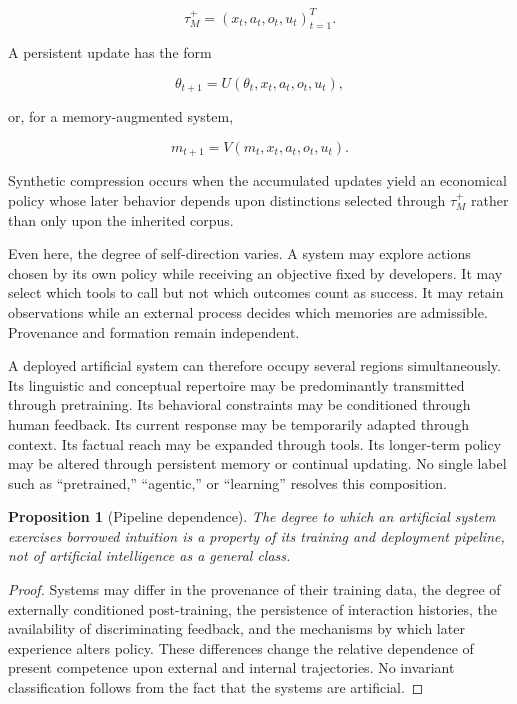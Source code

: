 \documentclass[11pt]{article}
\newtheorem{proposition}{Proposition}[section]
\begin{document}
\[
\tau_M^{+}
=
(x_t,a_t,o_t,u_t)_{t=1}^{T}.
\]

A persistent update has the form

\[
\theta_{t+1}
=
U(\theta_t,x_t,a_t,o_t,u_t),
\]

or, for a memory-augmented system,

\[
m_{t+1}
=
V(m_t,x_t,a_t,o_t,u_t).
\]

Synthetic compression occurs when the accumulated updates yield an economical policy whose later behavior depends upon distinctions selected through $\tau_M^{+}$ rather than only upon the inherited corpus.

Even here, the degree of self-direction varies. A system may explore actions chosen by its own policy while receiving an objective fixed by developers. It may select which tools to call but not which outcomes count as success. It may retain observations while an external process decides which memories are admissible. Provenance and formation remain independent.

A deployed artificial system can therefore occupy several regions simultaneously. Its linguistic and conceptual repertoire may be predominantly transmitted through pretraining. Its behavioral constraints may be conditioned through human feedback. Its current response may be temporarily adapted through context. Its factual reach may be expanded through tools. Its longer-term policy may be altered through persistent memory or continual updating. No single label such as ``pretrained,'' ``agentic,'' or ``learning'' resolves this composition.

\begin{proposition}[Pipeline dependence]
The degree to which an artificial system exercises borrowed intuition is a property of its training and deployment pipeline, not of artificial intelligence as a general class.
\end{proposition}

\begin{proof}
Systems may differ in the provenance of their training data, the degree of externally conditioned post-training, the persistence of interaction histories, the availability of discriminating feedback, and the mechanisms by which later experience alters policy. These differences change the relative dependence of present competence upon external and internal trajectories. No invariant classification follows from the fact that the systems are artificial.
\end{proof}
\end{document}
